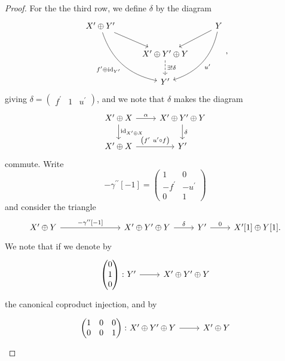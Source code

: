 \documentclass[dissertation.tex]{subfiles}
\begin{document}
\begin{prop}
\begin{proof}
  For the the third row, we define $\delta$ by the diagram
  $$\begin{tikzcd}
    X^\prime \oplus Y^\prime \arrow{rd}\arrow[bend right,swap]{rdd}{f^\prime \oplus \id_{Y^\prime}} & & Y \arrow{ld}\arrow[bend left]{ldd}{u^\prime}\\
    & X^\prime \oplus Y^\prime \oplus Y \arrow[dashed]{d}{\exists !\delta}\\
    & Y^\prime
  \end{tikzcd},$$
  giving
  $\delta = \left(\begin{matrix}
    f^\prime & 1 & u^\prime
    \end{matrix}\right)$,
  and we note that $\delta$ makes the diagram
  $$\begin{tikzcd}
    X^\prime \oplus X \arrow{r}{\alpha}\arrow{d}{\id_{X^\prime \oplus X}} & X^\prime \oplus Y^\prime \oplus Y \arrow{d}{\delta} \\
    X^\prime \oplus X \arrow{r}{\left(f^\prime\ u^\prime \circ f\right)} & Y^\prime
  \end{tikzcd}$$
  commute.
  Write 
  $$-\gamma^{\prime\prime}[-1] = \left(\begin{matrix}
    1 & 0\\
    -f^\prime & -u^\prime\\
    0 & 1 \end{matrix}\right)$$
  and consider the triangle
  $$\begin{tikzcd}[ampersand replacement=\&]
    X^\prime \oplus Y \arrow{rrr}{-\gamma^{\prime\prime}[-1]} \&\&\& X^\prime \oplus Y^\prime \oplus Y \arrow{r}{\delta} \& Y^\prime \arrow{r}{0} \& X^\prime[1] \oplus Y[1].
  \end{tikzcd}$$
  We note that if we denote by
  $$\begin{tikzcd}[ampersand replacement=\&]
    \left(\begin{matrix}0\\1\\0\end{matrix}\right) \colon Y^\prime \arrow{r} \& X^\prime \oplus Y^\prime \oplus Y 
  \end{tikzcd}$$
  the canonical coproduct injection, and by
  $$\begin{tikzcd}[ampersand replacement=\&]
    \left(\begin{matrix}1 & 0 & 0\\0 & 0 & 1\end{matrix}\right) \colon X^\prime \oplus Y^\prime \oplus Y \arrow{r} \& X^\prime \oplus Y
  \end{tikzcd}$$

\end{proof}
\end{prop}
\end{document}
